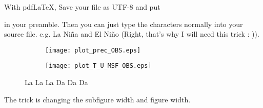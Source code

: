 
With pdfLaTeX, Save your file as UTF-8 and put
\usepackage[utf8]{inputenc}
\usepackage[T1]{fontenc}
in your preamble.
Then you can just type the characters normally into your source file.
e.g. La Ni\~na and El Ni\~no (Right, that's why I will need this trick : )).

\begin{figure}
\begin{subfigure}{0.945\textwidth}
\texttt{[image: plot\_prec\_OBS.eps]} 
\end{subfigure}
\begin{subfigure}{0.9\textwidth}
\texttt{[image: plot\_T\_U\_MSF\_OBS.eps]}
\end{subfigure}
\caption{ La La La Da Da Da}
 \end{figure}
The trick is changing the subfigure width and figure width.
